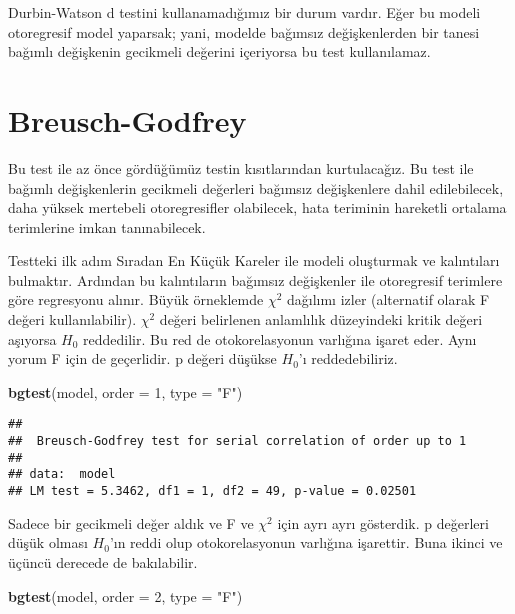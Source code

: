 \documentclass[
]{book}
\newenvironment{Shaded}{\begin{snugshade}}{\end{snugshade}}
\newcommand{\DataTypeTok}[1]{\textcolor[rgb]{0.13,0.29,0.53}{#1}}
\newcommand{\DecValTok}[1]{\textcolor[rgb]{0.00,0.00,0.81}{#1}}
\newcommand{\KeywordTok}[1]{\textcolor[rgb]{0.13,0.29,0.53}{\textbf{#1}}}
\newcommand{\NormalTok}[1]{#1}
\newcommand{\StringTok}[1]{\textcolor[rgb]{0.31,0.60,0.02}{#1}}
\begin{document}
Durbin-Watson d testini kullanamadığımız bir durum vardır. Eğer bu modeli otoregresif model yaparsak; yani, modelde bağımsız değişkenlerden bir tanesi bağımlı değişkenin gecikmeli değerini içeriyorsa bu test kullanılamaz.

\hypertarget{breusch-godfrey}{%
\section{Breusch-Godfrey}\label{breusch-godfrey}}

Bu test ile az önce gördüğümüz testin kısıtlarından kurtulacağız. Bu test ile bağımlı değişkenlerin gecikmeli değerleri bağımsız değişkenlere dahil edilebilecek, daha yüksek mertebeli otoregresifler olabilecek, hata teriminin hareketli ortalama terimlerine imkan tanınabilecek.

Testteki ilk adım Sıradan En Küçük Kareler ile modeli oluşturmak ve kalıntıları bulmaktır. Ardından bu kalıntıların bağımsız değişkenler ile otoregresif terimlere göre regresyonu alınır. Büyük örneklemde \(\chi^2\) dağılımı izler (alternatif olarak F değeri kullanılabilir). \(\chi^2\) değeri belirlenen anlamlılık düzeyindeki kritik değeri aşıyorsa \(H_0\) reddedilir. Bu red de otokorelasyonun varlığına işaret eder. Aynı yorum F için de geçerlidir. p değeri düşükse \(H_0\)'ı reddedebiliriz.

\begin{Shaded}
\begin{Highlighting}[]
\KeywordTok{bgtest}\NormalTok{(model, }\DataTypeTok{order =} \DecValTok{1}\NormalTok{, }\DataTypeTok{type =} \StringTok{"F"}\NormalTok{)}
\end{Highlighting}
\end{Shaded}

\begin{verbatim}
## 
##  Breusch-Godfrey test for serial correlation of order up to 1
## 
## data:  model
## LM test = 5.3462, df1 = 1, df2 = 49, p-value = 0.02501
\end{verbatim}

Sadece bir gecikmeli değer aldık ve F ve \(\chi^2\) için ayrı ayrı gösterdik. p değerleri düşük olması \(H_0\)'ın reddi olup otokorelasyonun varlığına işarettir. Buna ikinci ve üçüncü derecede de bakılabilir.

\begin{Shaded}
\begin{Highlighting}[]
\KeywordTok{bgtest}\NormalTok{(model, }\DataTypeTok{order =} \DecValTok{2}\NormalTok{, }\DataTypeTok{type =} \StringTok{"F"}\NormalTok{)}
\end{Highlighting}
\end{Shaded}
\end{document}
